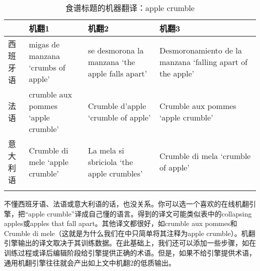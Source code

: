 \documentclass[output=paper]{langscibook}
\begin{document}
\begin{table}
\caption{食谱标题的机器翻译：apple crumble}
\label{tab:1:apple}
\begin{tabularx}{\textwidth}{
p{}
p{}
p{}
p{}} \lsptoprule
 & {机翻1} & {机翻2} & {机翻3} \\\midrule 
{西班牙语} & migas \newline de manzana \newline `crumbs of \newline apple' & se desmorona \newline la manzana \newline `the apple \newline falls apart' & Desmoronamiento \newline de la manzana \newline `falling apart of \newline the apple' \\\midrule
{法语} & crumble \newline aux pommes  \newline `apple crumble' & Crumble \newline d’apple  \newline `crumble of apple' & Crumble \newline aux pommes \newline `apple crumble'\\ \midrule
{意大利语} & Crumble \newline di mele \newline `apple \newline crumble' & La mela \newline si sbriciola \newline `the apple \newline crumbles' & Crumble \newline di mela \newline `crumble \newline of apple' \\\lspbottomrule 
\end{tabularx}
\end{table}


不懂西班牙语、法语或意大利语的话，也没关系。你可以选一个喜欢的在线机翻引擎，把“apple crumble”译成自己懂的语言。得到的译文可能类似表中的collapsing apples或apples that fall apart。其他译文都很好，如crumble aux pommes和Crumble di mele（这就是为什么我们在中只简单将其注释为apple crumble）。机翻引擎输出的译文取决于其训练数据。在此基础上，我们还可以添加一些步骤，如在训练过程或译后编辑阶段给引擎提供正确的术语。但是，如果不给引擎提供术语，通用机翻引擎往往就会产出如上文中机翻2的低质输出。
\end{document}
